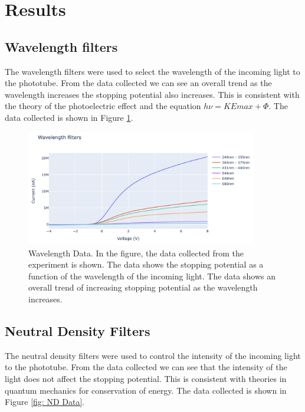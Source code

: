 \documentclass[12pt]{article}
\begin{document}
\section{Results}
        \subsection{Wavelength filters}
        The wavelength filters were used to select the wavelength of the incoming light to the phototube. From the data collected
        we can see an overall trend as the wavelength increases the stopping potential also increases. This is consistent with
        the theory of the photoelectric effect and the equation \( h\nu = KEmax + \Phi \). The data collected is shown in Figure \ref{fig: Wavelength Data}.

        \begin{figure}[!h]
                \centering
                \includegraphics[width=0.9\textwidth]{../imgs/Wavelenth_Filters.png}
                \caption{Wavelength Data. In the figure, the data collected from the experiment is shown. The data shows the 
                stopping potential as a function of the wavelength of the incoming light. The data shows an overall trend of
                increasing stopping potential as the wavelength increases.}
                \label{fig: Wavelength Data}
        \end{figure}

        \subsection{Neutral Density Filters}
        The neutral density filters were used to control the intensity of the incoming light to the phototube. From the data collected
        we can see that the intensity of the light does not affect the stopping potential. This is consistent with theories in quantum
        mechanics for conservation of energy. The data collected is shown in Figure \ref{fig: ND Data}.
\end{document}

